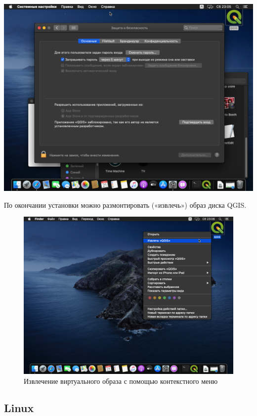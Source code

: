 \documentclass[
  12pt,
]{book}
\begin{document}
\includegraphics{images/Index0/mac08.png}

По окончании установки можно размонтировать («извлечь») образ диска QGIS.

\begin{figure}
\centering
\includegraphics{images/Index0/mac09.png}
\caption{Извлечение виртуального образа с помощью контекстного меню}
\end{figure}

\subsection*{Linux}\label{linux}
\end{document}
